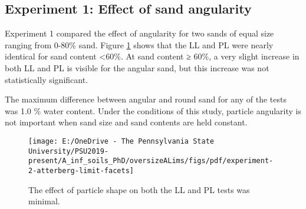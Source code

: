\documentclass[
  letterpaper,
]{article}
\begin{document}
\hypertarget{experiment-1-effect-of-sand-angularity}{%
\subsection{Experiment 1: Effect of sand angularity}\label{experiment-1-effect-of-sand-angularity}}

Experiment 1 compared the effect of angularity for two sands of equal size ranging from 0-80\% sand.
Figure \ref{fig:shape-experiment-atterberg-limit-facets} shows that the LL and PL were nearly identical for sand content \textless60\%.
At sand content ≥ 60\%, a very slight increase in both LL and PL is visible for the angular sand, but this increase was not statistically significant.

The maximum difference between angular and round sand for any of the tests was 1.0 \% water content.
Under the conditions of this study, particle angularity is not important when sand size and sand contents are held constant.

\begin{figure}

{\centering \texttt{[image: E:/OneDrive - The Pennsylvania State University/PSU2019-present/A\_inf\_soils\_PhD/oversizeALims/figs/pdf/experiment-2-atterberg-limit-facets]} 

}

\caption{The effect of particle shape on both the LL and PL tests was minimal.}\label{fig:shape-experiment-atterberg-limit-facets}
\end{figure}
\end{document}
